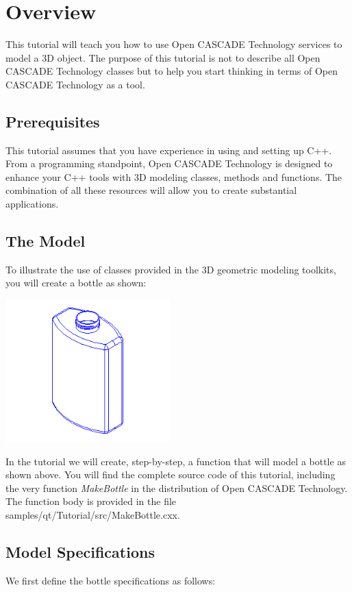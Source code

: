 \hypertarget{occt__tutorial_sec1}{}\section{Overview}\label{occt__tutorial_sec1}
This tutorial will teach you how to use Open C\+A\+S\+C\+A\+DE Technology services to model a 3D object. The purpose of this tutorial is not to describe all Open C\+A\+S\+C\+A\+DE Technology classes but to help you start thinking in terms of Open C\+A\+S\+C\+A\+DE Technology as a tool.\hypertarget{occt__tutorial_OCCT_TUTORIAL_SUB1_1}{}\subsection{Prerequisites}\label{occt__tutorial_OCCT_TUTORIAL_SUB1_1}
This tutorial assumes that you have experience in using and setting up C++. From a programming standpoint, Open C\+A\+S\+C\+A\+DE Technology is designed to enhance your C++ tools with 3D modeling classes, methods and functions. The combination of all these resources will allow you to create substantial applications.\hypertarget{occt__tutorial_OCCT_TUTORIAL_SUB1_2}{}\subsection{The Model}\label{occt__tutorial_OCCT_TUTORIAL_SUB1_2}
To illustrate the use of classes provided in the 3D geometric modeling toolkits, you will create a bottle as shown\+:


\begin{DoxyImageNoCaption}
\begin{center}
   \mbox{\includegraphics[width=240]{tutorial_image001.png}}
\end{center}
\end{DoxyImageNoCaption}


In the tutorial we will create, step-\/by-\/step, a function that will model a bottle as shown above. You will find the complete source code of this tutorial, including the very function {\itshape Make\+Bottle} in the distribution of Open C\+A\+S\+C\+A\+DE Technology. The function body is provided in the file samples/qt/\+Tutorial/src/\+Make\+Bottle.\+cxx.\hypertarget{occt__tutorial_OCCT_TUTORIAL_SUB1_3}{}\subsection{Model Specifications}\label{occt__tutorial_OCCT_TUTORIAL_SUB1_3}
We first define the bottle specifications as follows\+:

